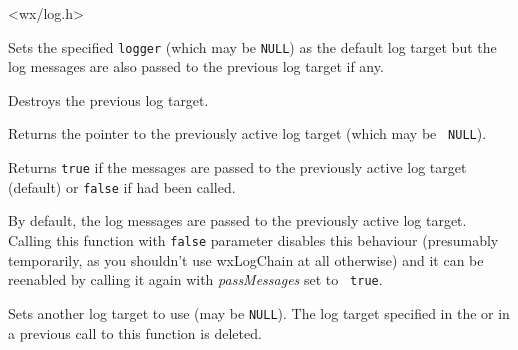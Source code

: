 


<wx/log.h>


\label{wxlogchainwxlogchain}


Sets the specified {\tt logger} (which may be {\tt NULL}) as the default log
target but the log messages are also passed to the previous log target if any.



Destroys the previous log target.

\label{wxlogchaingetoldlog}


Returns the pointer to the previously active log target (which may be {\tt
NULL}).

\label{wxlogchainispassingmessages}


Returns {\tt true} if the messages are passed to the previously active log
target (default) or {\tt false} if 
had been called.

\label{wxlogchainpassmessages}


By default, the log messages are passed to the previously active log target.
Calling this function with {\tt false} parameter disables this behaviour
(presumably temporarily, as you shouldn't use wxLogChain at all otherwise) and
it can be reenabled by calling it again with {\it passMessages} set to {\tt
true}.

\label{wxlogchainsetlog}


Sets another log target to use (may be {\tt NULL}). The log target specified
in the  or in a previous call to
this function is deleted.


